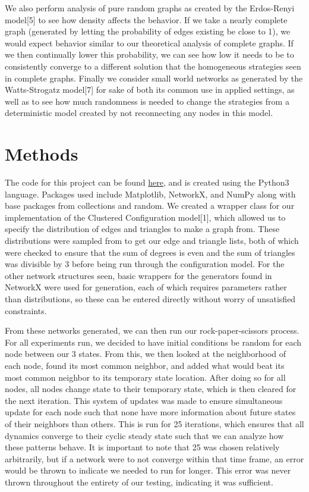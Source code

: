 \documentclass[letterpaper, 12 pt, conference]{ieeeconf}
\begin{document}
\par
We also perform analysis of pure random graphs as created by the Erdos-Renyi model[5] to see how density affects the behavior. If we take a nearly complete graph (generated by letting the probability of edges existing be close to 1), we would expect behavior similar to our theoretical analysis of complete graphs. If we then continually lower this probability, we can see how low it needs to be to consistently converge to a different solution that the homogeneous strategies seen in complete graphs.  Finally we consider small world networks as generated by the Watts-Strogatz model[7] for sake of both its common use in applied settings, as well as to see how much randomness is needed to change the strategies from a deterministic model created by not reconnecting any nodes in this model. 
\section*{Methods}
The code for this project can be found \href{https://github.com/zebernst/rock-paper-scissors-network}{here}, and is created using the Python3 language. Packages used include Matplotlib, NetworkX, and NumPy along with base packages from collections and random. We created a wrapper class for our implementation of the Clustered Configuration model[1], which allowed us to specify the distribution of edges and triangles to make a graph from. These distributions were sampled from to get our edge and triangle lists, both of which were checked to ensure that the sum of degrees is even and the sum of triangles was divisible by 3 before being run through the configuration model. For the other network structures seen, basic wrappers for the generators found in NetworkX were used for generation, each of which requires parameters rather than distributions, so these can be entered directly without worry of unsatisfied constraints. 
\par
From these networks generated, we can then run our rock-paper-scissors process. For all experiments run, we decided to have initial conditions be random for each node between our 3 states. From this, we then looked at the neighborhood of each node, found its most common neighbor, and added what would beat its most common neighbor to its temporary state location. After doing so for all nodes, all nodes change state to their temporary state, which is then cleared for the next iteration. This system of updates was made to ensure simultaneous update for each node such that none have more information about future states of their neighbors than others. This is run for 25 iterations, which ensures that all dynamics converge to their cyclic steady state such that we can analyze how these patterns behave. It is important to note that 25 was chosen relatively arbitrarily, but if a network were to not converge within that time frame, an error would be thrown to indicate we needed to run for longer. This error was never thrown throughout the entirety of our testing, indicating it was sufficient. 
\end{document}
